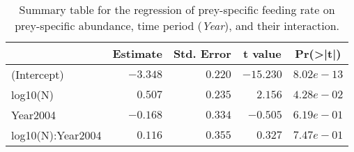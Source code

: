 \begin{table}[!htbp]
\caption{Summary table for the regression of prey-specific feeding rate 
  on prey-specific abundance,
  time period (\emph{Year}), 
  and their interaction.\label{tab:FNYint}} 
\begin{center}
\begin{tabular}{lrrrr}
\hline
\multicolumn{1}{l}{}&\multicolumn{1}{c}{Estimate}&\multicolumn{1}{c}{Std. Error}&\multicolumn{1}{c}{t value}&\multicolumn{1}{c}{Pr(\textgreater |t|)}\tabularnewline
\hline
(Intercept)&$-3.348$&$0.220$&$-15.230$&$8.02e-13$\tabularnewline
log10(N)&$ 0.507$&$0.235$&$  2.156$&$4.28e-02$\tabularnewline
Year2004&$-0.168$&$0.334$&$ -0.505$&$6.19e-01$\tabularnewline
log10(N):Year2004&$ 0.116$&$0.355$&$  0.327$&$7.47e-01$\tabularnewline
\hline
\end{tabular}\end{center}
\end{table}
